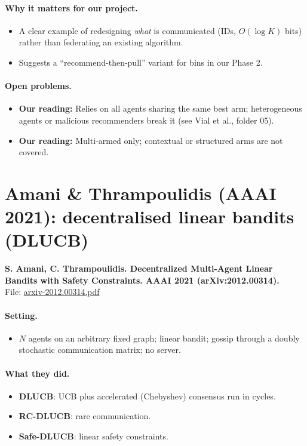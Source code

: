 \documentclass[11pt]{article}
\newcommand{\ours}{\textcolor{orange!80!black}{\textbf{Our reading:}}}
\newcommand{\file}[1]{\url{#1}}
\begin{document}
\paragraph{Why it matters for our project.}
\begin{itemize}\item A clear example of redesigning \emph{what} is communicated (IDs, $O(\log K)$ bits) rather than federating an existing algorithm.\item Suggests a ``recommend-then-pull'' variant for bins in our Phase 2.\end{itemize}
\paragraph{Open problems.}
\begin{itemize}\item \ours{} Relies on all agents sharing the same best arm; heterogeneous agents or malicious recommenders break it (see Vial et al., folder 05).\item \ours{} Multi-armed only; contextual or structured arms are not covered.\end{itemize}
\section{Amani \& Thrampoulidis (AAAI 2021): decentralised linear bandits (DLUCB)}
\textbf{S. Amani, C. Thrampoulidis. Decentralized Multi-Agent Linear Bandits with Safety Constraints. AAAI 2021 (arXiv:2012.00314).}\\ File: \file{arxiv-2012.00314.pdf}
\paragraph{Setting.}
\begin{itemize}\item $N$ agents on an arbitrary fixed graph; linear bandit; gossip through a doubly stochastic communication matrix; no server.\end{itemize}
\paragraph{What they did.}
\begin{itemize}\item \textbf{DLUCB}: UCB plus accelerated (Chebyshev) consensus run in cycles.\item \textbf{RC-DLUCB}: rare communication.\item \textbf{Safe-DLUCB}: linear safety constraints.\end{itemize}
\end{document}
